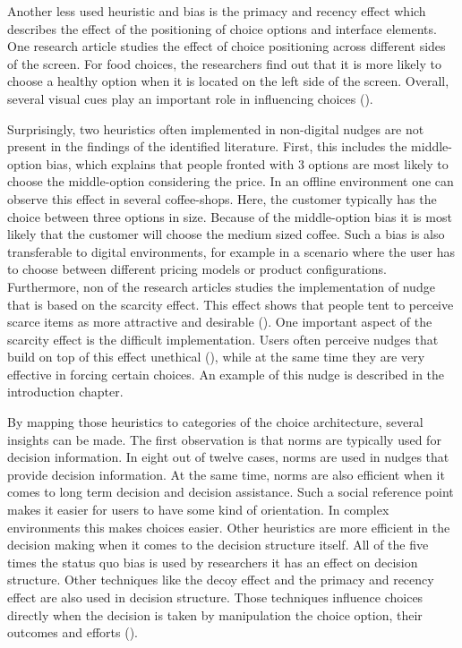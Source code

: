 Another less used heuristic and bias is the primacy and recency effect which describes the effect of the positioning of choice options and interface elements. One research article studies the effect of choice positioning across different sides of the screen. For food choices, the researchers find out that it is more likely to choose a healthy option when it is located on the left side of the screen. Overall, several visual cues play an important role in influencing choices (\cite{romero_healthy-left_2016}).

Surprisingly, two heuristics often implemented in non-digital nudges are not present in the findings of the identified literature. First, this includes the middle-option bias, which explains that people fronted with 3 options are most likely to choose the middle-option considering the price. In an offline environment one can observe this effect in several coffee-shops. Here, the customer typically has the choice between three options in size. Because of the middle-option bias it is most likely that the customer will choose the medium sized coffee. Such a bias is also transferable to digital environments, for example in a scenario where the user has to choose between different pricing models or product configurations. 
Furthermore, non of the research articles studies the implementation of nudge that is based on the scarcity effect. This effect shows that people tent to perceive scarce items as more attractive and desirable (\cite{Fromkin1980}). One important aspect of the scarcity effect is the difficult implementation. Users often perceive nudges that build on top of this effect unethical (\cite{sunstein_nudging_2015}), while at the same time they are very effective in forcing certain choices. An example of this nudge is described in the introduction chapter.

By mapping those heuristics to categories of the choice architecture, several insights can be made. The first observation is that norms are typically used for decision information. In eight out of twelve cases, norms are used in nudges that provide decision information. At the same time, norms are also efficient when it comes to long term decision and decision assistance. Such a social reference point makes it easier for users to have some kind of orientation. In complex environments this makes choices easier. 
Other heuristics are more efficient in the decision making when it comes to the decision structure itself. All of the five times the status quo bias is used by researchers it has an effect on decision structure.
Other techniques like the decoy effect and the primacy and recency effect are also used in decision structure. Those techniques influence choices directly when the decision is taken by manipulation the choice option, their outcomes and efforts (\cite{munscher_review_2016}).



